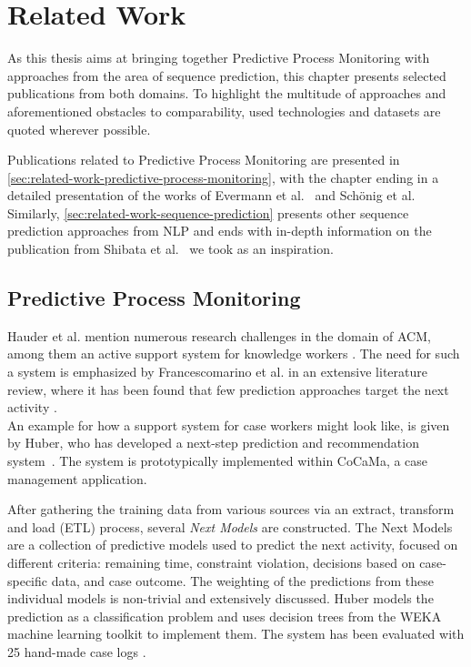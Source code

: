 \chapter{Related Work}\label{chap:related-work}
As this thesis aims at bringing together Predictive Process Monitoring with approaches from the area of sequence prediction, this chapter presents selected publications from both domains. To highlight the multitude of approaches and aforementioned obstacles to comparability, used technologies and datasets are quoted wherever possible.

Publications related to Predictive Process Monitoring are presented in \autoref{sec:related-work-predictive-process-monitoring}, with the chapter ending in a detailed presentation of the works of Evermann et al.~\cite{evermann2016} and Schönig et al.~\cite{schoenig2018} Similarly, \autoref{sec:related-work-sequence-prediction} presents other sequence prediction approaches from NLP and ends with in-depth information on the publication from Shibata et al.~\cite{shibata2016bipartite} we took as an inspiration.

\section{Predictive Process Monitoring}
\label{sec:related-work-predictive-process-monitoring}
Hauder et al. mention numerous research challenges in the domain of ACM, among them an active support system for knowledge workers \cite{hauder2014}.
The need for such a system is emphasized by Francescomarino et al. in an extensive literature review, where it has been found that few prediction approaches target the next activity \cite{francescomarino2018}.\\

An example for how a support system \cite{hauder2014} for case workers might look like, is given by Huber, who has developed a next-step prediction and recommendation system~\cite{huber2015}. The system is prototypically implemented within CoCaMa, a case management application.

After gathering the training data from various sources via an extract, transform and load (ETL) process, several \textit{Next Models} are constructed. The Next Models are a collection of predictive models used to predict the next activity, focused on different criteria: remaining time, constraint violation, decisions based on case-specific data, and case outcome. The weighting of the predictions from these individual models is non-trivial and extensively discussed. Huber models the prediction as a classification problem and uses decision trees from the WEKA \cite{web:weka} machine learning toolkit to implement them. The system has been evaluated with 25 hand-made case logs \cite{huber2015}.\\

